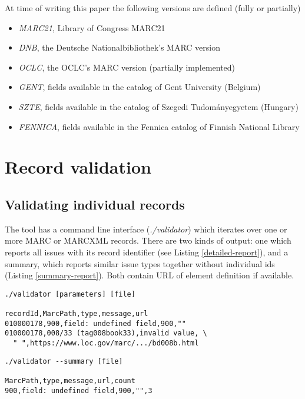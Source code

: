 At time of writing this paper the following versions are defined (fully or partially)

\begin{itemize}
 \setlength{\parskip}{0pt}
 \setlength{\itemsep}{0pt plus 1pt}
  \item \emph{MARC21}, Library of Congress MARC21
  \item \emph{DNB}, the Deutsche Nationalbibliothek's MARC version
  \item \emph{OCLC}, the OCLC's MARC version (partially implemented)
  \item \emph{GENT}, fields available in the catalog of Gent University (Belgium)
  \item \emph{SZTE}, fields available in the catalog of Szegedi Tudományegyetem (Hungary)
  \item \emph{FENNICA}, fields available in the Fennica catalog of Finnish National Library
\end{itemize}


\section{Record validation}

\subsection{Validating individual records}

The tool has a command line interface (\emph{./validator}) which iterates over one or more MARC or MARCXML records. There are two kinds of output: one which reports all issues with its record identifier (see Listing \ref{detailed-report}), and a summary, which reports similar issue types together without individual ids (Listing \ref{summary-report}). Both contain URL of element definition if available.

\begin{lstlisting}[float, caption=Detailed report, label=detailed-report]
./validator [parameters] [file]

recordId,MarcPath,type,message,url
010000178,900,field: undefined field,900,""
010000178,008/33 (tag008book33),invalid value, \
  " ",https://www.loc.gov/marc/.../bd008b.html
\end{lstlisting}

\begin{lstlisting}[float, caption=Summarized report, label=summary-report]
./validator --summary [file]

MarcPath,type,message,url,count
900,field: undefined field,900,"",3
\end{lstlisting}

